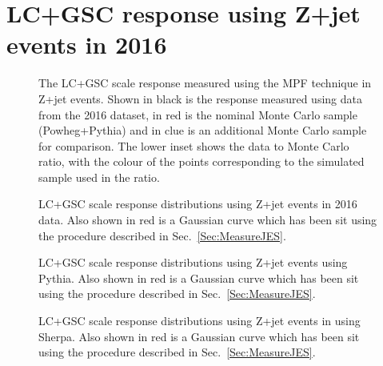 \chapter{LC+GSC response using Z+jet events in 2016}
\label{App:ZJetLC2016}

\begin{figure}[!ht]
  \begin{center}
  \end{center}
  \caption[LC scale response using Z+jet in 2016]
  {\small The LC+GSC scale response measured using the MPF technique in Z+jet events.  Shown in black is the response measured using data from the 2016 dataset, in red is the nominal Monte Carlo sample (Powheg+Pythia) and in clue is an additional Monte Carlo sample for comparison.  The lower inset shows the data to Monte Carlo ratio, with the colour of the points corresponding to the simulated sample used in the ratio.  }
  \label{plot:ZJetLC2016App}
\end{figure}


\begin{figure}[!ht]
  \begin{center}
  \end{center}
  \caption[LC scale response distributions in data using Z+jet in 2016]
  {\small LC+GSC scale response distributions using Z+jet events in 2016 data.  Also shown in red is a Gaussian curve which has been sit using the procedure described in Sec.~\ref{Sec:MeasureJES}. }
  \label{plot:ZJetLC2016DataDistsApp}
\end{figure}

\begin{figure}[!ht]
  \begin{center}
  \end{center}
  \caption[LC scale response distributions in Pythia using Z+jet in 2016]
  {\small LC+GSC scale response distributions using Z+jet events using Pythia.  Also shown in red is a Gaussian curve which has been sit using the procedure described in Sec.~\ref{Sec:MeasureJES}. }
  \label{plot:ZJetLC2016PythiaistsApp}
\end{figure}

\begin{figure}[!ht]
  \begin{center}
  \end{center}
  \caption[LC scale response distributions in Sherpa using Z+jet in 2016]
  {\small LC+GSC scale response distributions using Z+jet events in using Sherpa.  Also shown in red is a Gaussian curve which has been sit using the procedure described in Sec.~\ref{Sec:MeasureJES}. }
  \label{plot:ZJetLC2016SherpaDistsApp}
\end{figure}

